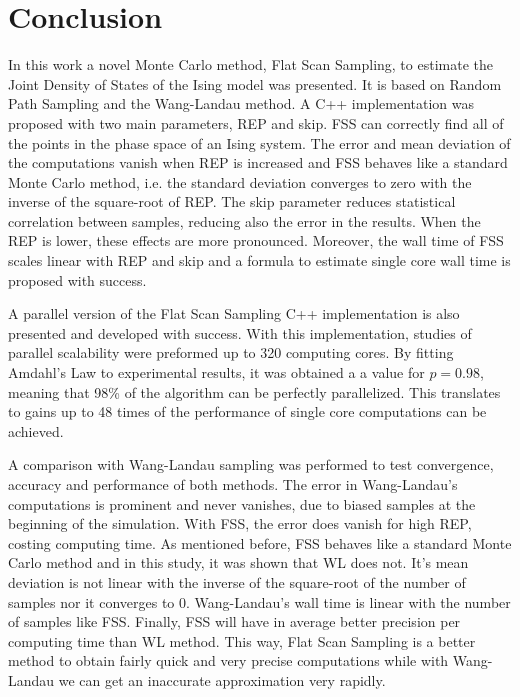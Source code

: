 \chapter{Conclusion}

	In this work a novel Monte Carlo method, Flat Scan Sampling, to estimate the Joint Density of States of the Ising model was presented. It is based on Random Path Sampling and the Wang-Landau method. A C++ implementation was proposed with two main parameters, REP and skip. FSS can correctly find all of the points in the phase space of an Ising system. The error and mean deviation of the computations vanish when REP is increased and FSS behaves like a standard Monte Carlo method, i.e. the standard deviation converges to zero with the inverse of the square-root of REP. The skip parameter reduces statistical correlation between samples, reducing also the error in the results. When the REP is lower, these effects are more pronounced. Moreover, the wall time of FSS scales linear with REP and skip and a formula to estimate single core wall time is proposed with success.

	A parallel version of the Flat Scan Sampling C++ implementation is also presented and developed with success. With this implementation, studies of parallel scalability were preformed up to 320 computing cores. By fitting Amdahl's Law to experimental results, it was obtained a a value for $p=0.98$, meaning that 98\% of the algorithm can be perfectly parallelized. This translates to gains up to 48 times of the performance of single core computations can be achieved.

	A comparison with Wang-Landau sampling was performed to test convergence, accuracy and performance of both methods. The error in Wang-Landau's computations is prominent and never vanishes, due to biased samples at the beginning of the simulation. With FSS, the error does vanish for high REP, costing computing time. As mentioned before, FSS behaves like a standard Monte Carlo method and in this study, it was shown that WL does not. It's mean deviation is not linear with the inverse of the square-root of the number of samples nor it converges to 0. Wang-Landau's wall time is linear with the number of samples like FSS. Finally, FSS will have in average better precision per computing time than WL method. This way, Flat Scan Sampling is a better method to obtain fairly quick and very precise computations while with Wang-Landau we can get an inaccurate approximation very rapidly.

